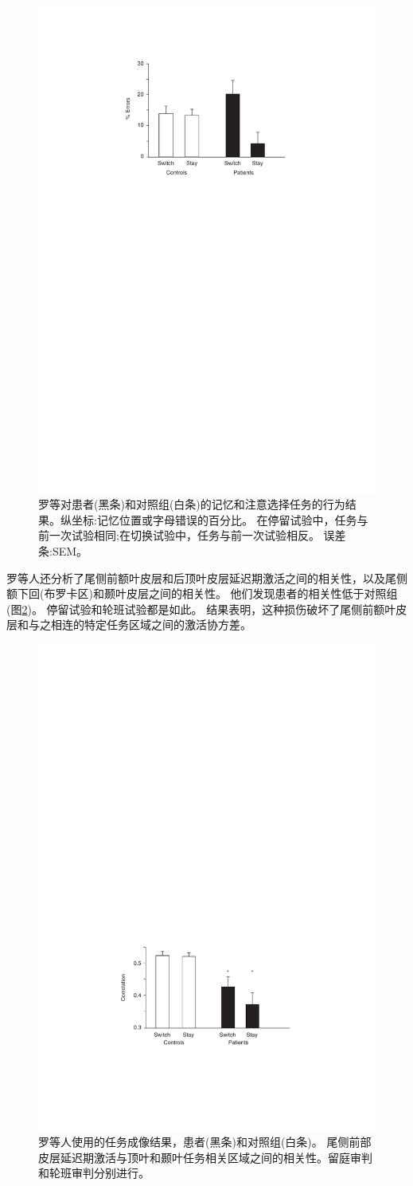 \begin{figure}[!htb]
	\centering
	\includegraphics[width=0.5\linewidth]{chap9/9_5}
	\caption{罗等对患者(黑条)和对照组(白条)的记忆和注意选择任务的行为结果。纵坐标:记忆位置或字母错误的百分比。
		在停留试验中，任务与前一次试验相同;在切换试验中，任务与前一次试验相反。
		误差条:SEM\cite{rowe2007prefrontal}。\label{fig:fig_9_5}}
\end{figure}

\par


罗等人还分析了尾侧前额叶皮层和后顶叶皮层延迟期激活之间的相关性，以及尾侧额下回(布罗卡区)和颞叶皮层之间的相关性。
他们发现患者的相关性低于对照组(图\ref{fig:fig_9_6})。
停留试验和轮班试验都是如此。
结果表明，这种损伤破坏了尾侧前额叶皮层和与之相连的特定任务区域之间的激活协方差。
\par


\begin{figure}[!htb]
	\centering
	\includegraphics[width=0.5\linewidth]{chap9/9_6}
	\caption{罗等人使用的任务成像结果，患者(黑条)和对照组(白条)。
		尾侧前部皮层延迟期激活与顶叶和颞叶任务相关区域之间的相关性。留庭审判和轮班审判分别进行\cite{rowe2007prefrontal}。\label{fig:fig_9_6}}
\end{figure}

